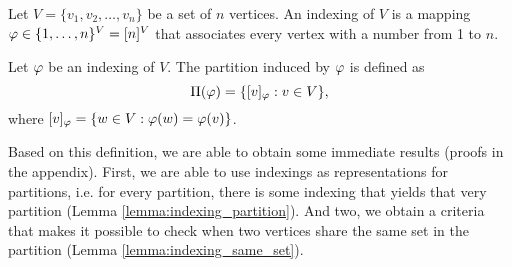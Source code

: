 \begin{definition}
    Let $V = \{ v_1,v_2,\dots, v_n \}$ be a set of $n$ vertices. An indexing of $V$ is a mapping $\varphi \in \{ 1,\dots,n \}^V = [n]^V$ that associates every vertex with a number from 1 to $n$.
\end{definition}

\begin{definition}
    Let $\varphi$ be an indexing of $V$. The partition induced by $\varphi$ is defined as
    \begin{equation}
        \Pi(\varphi)= \{ [v]_\varphi : v \in V \}, \label{eq:indexing}
    \end{equation}
    where $[v]_\varphi = \{ w \in V : \varphi(w) = \varphi(v) \}$.
\end{definition}

Based on this definition, we are able to obtain some immediate results (proofs in the appendix). First, we are able to use indexings as representations for partitions, i.e. for every partition, there is some indexing that yields that very partition (Lemma \ref{lemma:indexing_partition}). And two, we obtain a criteria that makes it possible to check when two vertices share the same set in the partition (Lemma \ref{lemma:indexing_same_set}).  

